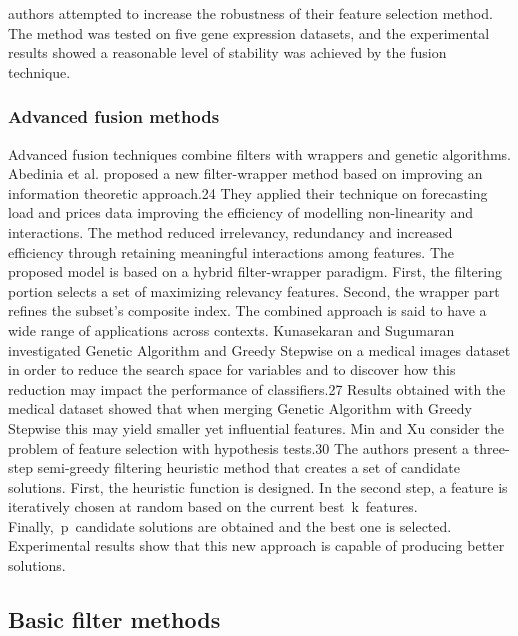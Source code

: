 \documentclass[review]{elsarticle}
\begin{document}
authors attempted to increase the robustness of their feature selection method. The method was tested on five gene expression datasets, and the experimental results showed a reasonable level of stability was achieved by the fusion technique.  

\subsubsection{Advanced fusion methods}

Advanced fusion techniques combine filters with wrappers and genetic algorithms. Abedinia et al. proposed a new filter-wrapper method based on improving an information theoretic approach.24  They applied their technique on forecasting load and prices data improving the efficiency of modelling non-linearity and interactions. The method reduced irrelevancy, redundancy and increased efficiency through retaining meaningful interactions among features. The proposed model is based on a hybrid filter-wrapper paradigm. First, the filtering portion selects a set of maximizing relevancy features. Second, the wrapper part refines the subset's composite index. The combined approach is said to have a wide range of applications across contexts. Kunasekaran and Sugumaran  investigated Genetic Algorithm and Greedy Stepwise on a medical images dataset in order to reduce the search space for variables and to discover how this reduction may impact the performance of classifiers.27  Results obtained with the medical dataset showed that when merging Genetic Algorithm with Greedy Stepwise this may yield smaller yet influential features. Min and Xu consider the problem of feature selection with hypothesis tests.30  The authors present a three-step semi-greedy filtering heuristic method that creates a set of candidate solutions. First, the heuristic function is designed. In the second step, a feature is iteratively chosen at random based on the current best k features. Finally, p candidate solutions are obtained and the best one is selected. Experimental results show that this new approach is capable of producing better solutions.

\subsection{Basic filter methods}
\end{document}
